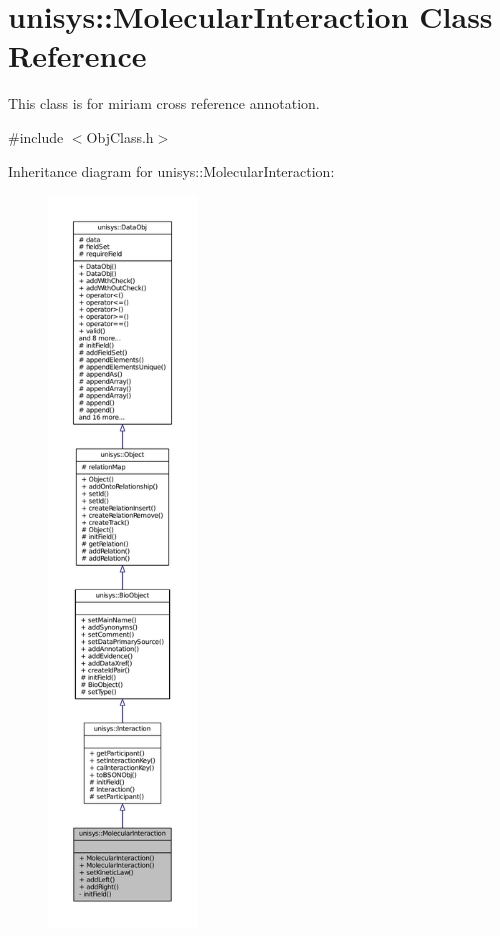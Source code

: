 \hypertarget{classunisys_1_1MolecularInteraction}{\section{unisys\-:\-:Molecular\-Interaction Class Reference}
\label{classunisys_1_1MolecularInteraction}
}


This class is for miriam cross reference annotation.  




{\ttfamily \#include $<$Obj\-Class.\-h$>$}



Inheritance diagram for unisys\-:\-:Molecular\-Interaction\-:
\nopagebreak
\begin{figure}[H]
\begin{center}
\leavevmode
\includegraphics[height=550pt]{classunisys_1_1MolecularInteraction__inherit__graph}
\end{center}
\end{figure}


